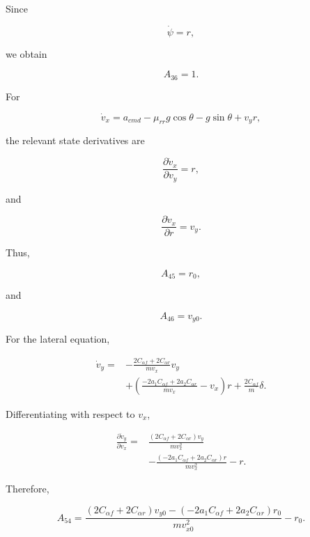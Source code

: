\documentclass[12pt,a4paper]{article}
\begin{document}
Since

\begin{equation}
\dot\psi=r,
\end{equation}

we obtain

\begin{equation}
\boxed{
A_{36}=1
}.
\end{equation}

For

\begin{equation}
\dot v_x
=
a_{cmd}
-\mu_{rr}g\cos\theta
-g\sin\theta
+v_yr,
\end{equation}

the relevant state derivatives are

\begin{equation}
\frac{\partial\dot v_x}{\partial v_y}
=
r,
\end{equation}

and

\begin{equation}
\frac{\partial\dot v_x}{\partial r}
=
v_y.
\end{equation}

Thus,

\begin{equation}
A_{45}=r_0,
\end{equation}

and

\begin{equation}
A_{46}=v_{y0}.
\end{equation}

For the lateral equation,

\begin{align}
\dot v_y
={}&
-\frac{2C_{\alpha f}+2C_{\alpha r}}
{mv_x}v_y
\nonumber\\
&+
\left(
\frac{-2a_1C_{\alpha f}+2a_2C_{\alpha r}}
{mv_x}
-v_x
\right)r
+
\frac{2C_{\alpha f}}{m}\delta.
\end{align}

Differentiating with respect to $v_x$,

\begin{align}
\frac{\partial\dot v_y}{\partial v_x}
={}&
\frac{
(2C_{\alpha f}+2C_{\alpha r})v_y
}
{mv_x^2}
\nonumber\\
&-
\frac{
(-2a_1C_{\alpha f}+2a_2C_{\alpha r})r
}
{mv_x^2}
-r.
\end{align}

Therefore,

\begin{equation}
\boxed{
A_{54}
=
\frac{
(2C_{\alpha f}+2C_{\alpha r})v_{y0}
-
(-2a_1C_{\alpha f}+2a_2C_{\alpha r})r_0
}
{mv_{x0}^2}
-r_0
}.
\end{equation}
\end{document}
